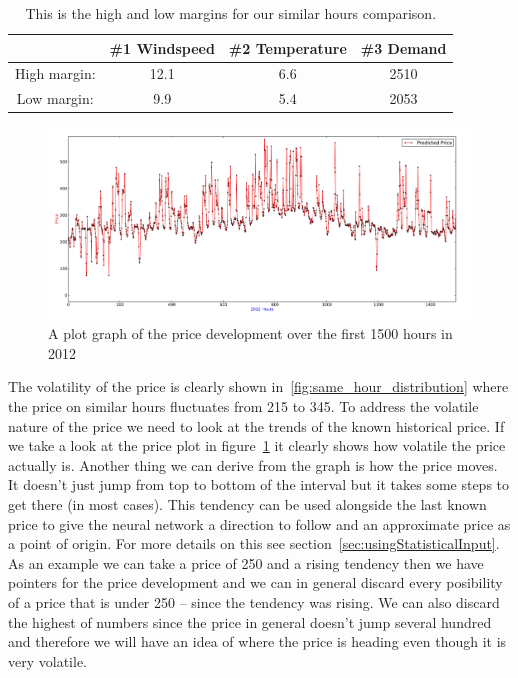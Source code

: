 \begin{table}[H]
\centering  %
\begin{tabular}{c c c c} %
 & \#1 Windspeed & \#2 Temperature & \#3 Demand \\ [0.5ex] %
\hline                  %
High margin: & 12.1 & 6.6 & 2510  \\
Low margin: & 9.9 & 5.4 & 2053 \\ [1ex] %
\hline %
\end{tabular}
\caption{This is the high and low margins for our similar hours comparison.} %
\label{table:similarHoursLimits} %
\end{table}

\begin{figure}[H]
\centering
\includegraphics[width=\textwidth ]{billeder/energy_price_plots/plotGraph.jpg}
\caption{A plot graph of the price development over the first 1500 hours in 2012}
\label{fig:plotGraph}
\end{figure}

The volatility of the price is clearly shown in~\ref{fig:same_hour_distribution} where the price on similar hours fluctuates from 215 to 345. To address the volatile nature of the price we need to look at the trends of the known historical price. If we take a look at the price plot in figure~\ref{fig:plotGraph} it clearly shows how volatile the price actually is. Another thing we can derive from the graph is how the price moves. It doesn't just jump from top to bottom of the interval but it takes some steps to get there (in most cases). This tendency can be used alongside the last known price to give the neural network a direction to follow and an approximate price as a point of origin. For more details on this see section~\ref{sec:usingStatisticalInput}. As an example we can take a price of 250 and a rising tendency then we have pointers for the price development and we can in general discard every posibility of a price that is under 250 -- since the tendency was rising. We can also discard the highest of numbers since the price in general doesn't jump several hundred and therefore we will have an idea of where the price is heading even though it is very volatile.

